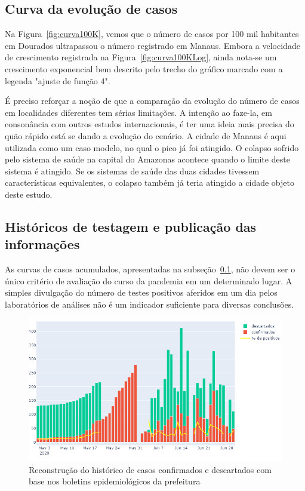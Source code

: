 \documentclass[12pt]{article}
\begin{document}
\subsection{Curva da evolução de casos}\label{ssec:curvas}

Na Figura~\ref{fig:curva100K}, vemos que o número de casos por 100 mil habitantes em Dourados ultrapassou o número registrado em Manaus. Embora a velocidade de crescimento registrada na Figura~\ref{fig:curva100KLog}, ainda nota-se um crescimento exponencial bem descrito pelo trecho do gráfico marcado com a legenda "ajuste de função 4".

É preciso reforçar a noção de que a comparação da evolução do número de casos em localidades diferentes tem sérias limitações. A intenção ao faze-la, em consonância com outros estudos internacionais, é ter uma ideia mais precisa do quão rápido está se dando a evolução do cenário. A cidade de Manaus é aqui utilizada como um caso modelo, no qual o pico já foi atingido. O colapso sofrido pelo sistema de saúde na capital do Amazonas acontece quando o limite deste sistema é atingido. Se os sistemas de saúde das duas cidades tivessem características equivalentes, o colapso também já teria atingido a cidade objeto deste estudo.

\subsection{Históricos de testagem e publicação das informações}\label{ssec:pubDados}

As curvas de casos acumulados, apresentadas na subseção~\ref{ssec:curvas}, não devem ser o único critério de avaliação do curso da pandemia em um determinado lugar. A simples divulgação do número de testes positivos aferidos em um dia pelos laboratórios de análises não é um indicador suficiente para diversas conclusões.

\begin{figure}[!htb]
  \centering
  \includegraphics[width=.75\textwidth]{figs/casos_conf_desc.png}
  \caption{Reconstrução do histórico de casos confirmados e descartados com base nos boletins epidemiológicos da prefeitura}
  \label{fig:histTeste}
  \end{figure}
\end{document}

